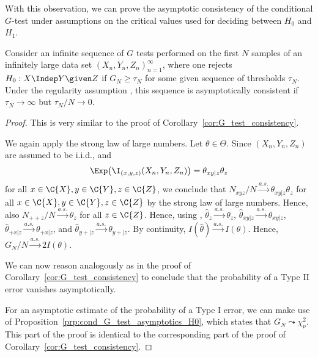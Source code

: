 With this observation, we can prove the asymptotic consistency of the conditional $G$-test under assumptions on the critical values used
for deciding between $H_0$ and $H_1$.
\begin{Cor}\label{cor:cond_G_test_consistency}
Consider an infinite sequence of $G$ tests performed on the first $N$ samples of an infinitely large
data set $(X_n,Y_n,Z_n)_{n=1}^\infty$,
where one rejects $H_0 : X \Indep Y \given Z$ if $G_N \ge \tau_N$ for some given
sequence of thresholds $\tau_N$.
Under the regularity assumption , this sequence is
asymptotically consistent if $\tau_N \to \infty$ but $\tau_N / N \to 0$.
\end{Cor}
\begin{proof}
This is very similar to the proof of Corollary~\ref{cor:G_test_consistency}.
  
We again apply the strong law of large numbers.
Let $\theta \in \Theta$. Since $(X_n,Y_n,Z_n)$ are assumed to be i.i.d., and 
  $$\Exp \big(\I_{(x,y,z)}(X_n,Y_n,Z_n)\big) = \theta_{xy|z}\theta_z$$
for all $x \in \C{X}, y \in \C{Y}, z \in \C{Z}$,
we conclude that $N_{xyz} / N \stackrel{a.s.}{\to} \theta_{xy|z} \theta_z$ for all $x \in \C{X}, y \in \C{Y}, z\in \C{Z}$
by the strong law of large numbers. Hence, also $N_{+ + z} / N \stackrel{a.s.}{\to} \theta_z$ for all $z \in \C{Z}$.
Hence, using ,
$\hat\theta_z \stackrel{a.s.}{\to} \theta_z$,
$\hat\theta_{xy|z} \stackrel{a.s.}{\to} \theta_{xy|z}$,
$\hat\theta_{+ x|z} \stackrel{a.s.}{\to} \theta_{+ x|z}$, and
$\hat\theta_{y +|z} \stackrel{a.s.}{\to} \theta_{y +|z}$.
By continuity, $I(\hat\theta) \stackrel{a.s.}{\to} I(\theta)$.
Hence, $G_N / N \stackrel{a.s.}{\to} 2I(\theta)$. 
  
We can now reason analogously as in the proof of 
Corollary~\ref{cor:G_test_consistency} to conclude that
the probability of a Type II error vanishes asymptotically.

For an asymptotic estimate of the probability of a Type I error,
we can make use of Proposition~\ref{prp:cond_G_test_asymptotics_H0},
which states that $G_N \leadsto \chi_{\nu}^2$. 
This part of the proof is identical to the corresponding part of the proof of Corollary~\ref{cor:G_test_consistency}.
\end{proof}
